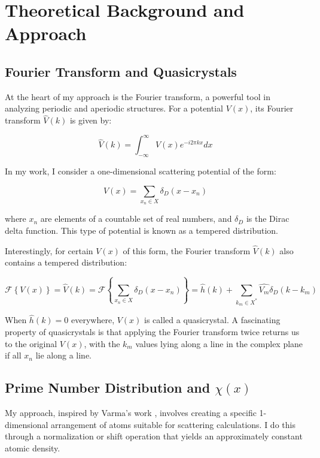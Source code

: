 \documentclass[11pt, oneside]{article}
\begin{document}
\section{Theoretical Background and Approach}

\subsection{Fourier Transform and Quasicrystals}

At the heart of my approach is the Fourier transform, a powerful tool in analyzing periodic and aperiodic structures. For a potential $V(x)$, its Fourier transform $\hat{V}(k)$ is given by:

\begin{equation}
\hat{V}(k) = \int_{-\infty}^{\infty}V(x)e^{-i2\pi kx}dx
\end{equation}

In my work, I consider a one-dimensional scattering potential of the form:

\begin{equation}
V(x) = \sum_{x_n \in X}\delta_D(x - x_n)
\end{equation}

where $x_n$ are elements of a countable set of real numbers, and $\delta_D$ is the Dirac delta function. This type of potential is known as a tempered distribution.

Interestingly, for certain $V(x)$ of this form, the Fourier transform $\hat{V}(k)$ also contains a tempered distribution:
  
\begin{equation}
\label{eq: RiemannFourier}
\mathcal{F}\left \{V(x)\right \} = \hat{V}(k) = \mathcal{F}\left \{ \sum_{x_n \in X}\delta_D(x - x_n) \right \} = \hat{h}(k) +  \sum_{k_m \in X^{*}} \hat{V_{m}} \delta_D(k - k_{m})
\end{equation}

When $\hat{h}(k) = 0$ everywhere, $V(x)$ is called a quasicrystal. A fascinating property of quasicrystals is that applying the Fourier transform twice returns us to the original $V(x)$, with the $k_m$ values lying along a line in the complex plane if all $x_n$ lie along a line.

\subsection{Prime Number Distribution and $\chi(x)$}

My approach, inspired by Varma's work \cite{Varma2016}, involves creating a specific 1-dimensional arrangement of atoms suitable for scattering calculations. I do this through a normalization or shift operation that yields an approximately constant atomic density.
\end{document}

